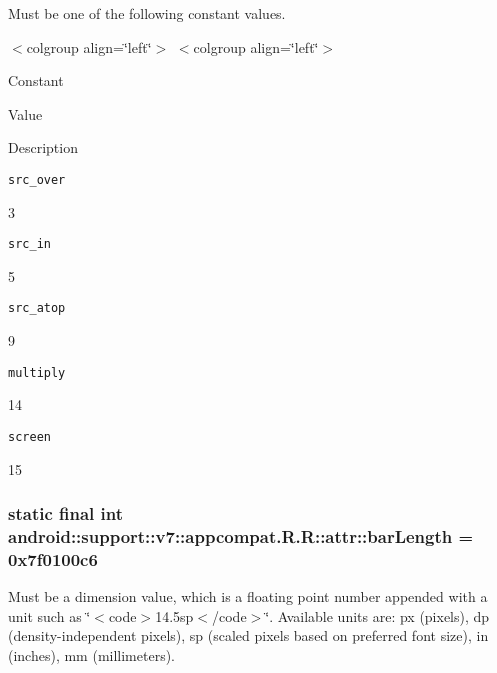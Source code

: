 Must be one of the following constant values. \begin{TabularC}{0}
\hline
\end{TabularC}
$<$colgroup align=\char`\"{}left\char`\"{}$>$ $<$colgroup align=\char`\"{}left\char`\"{}$>$ 

Constant

Value

Description 

{\tt src\_\-over}

3

{\tt src\_\-in}

5

{\tt src\_\-atop}

9

{\tt multiply}

14

{\tt screen}

15\hypertarget{classandroid_1_1support_1_1v7_1_1appcompat_1_1_r_1_1attr_b67ba8a6545ad54da37c8a16d9e7735d}{
\subsubsection[{barLength}]{\setlength{\rightskip}{0pt plus 5cm}static final int android::support::v7::appcompat.R.R::attr::barLength = 0x7f0100c6}}
\label{classandroid_1_1support_1_1v7_1_1appcompat_1_1_r_1_1attr_b67ba8a6545ad54da37c8a16d9e7735d}


Must be a dimension value, which is a floating point number appended with a unit such as \char`\"{}$<$code$>$14.5sp$<$/code$>$\char`\"{}. Available units are: px (pixels), dp (density-independent pixels), sp (scaled pixels based on preferred font size), in (inches), mm (millimeters). 

